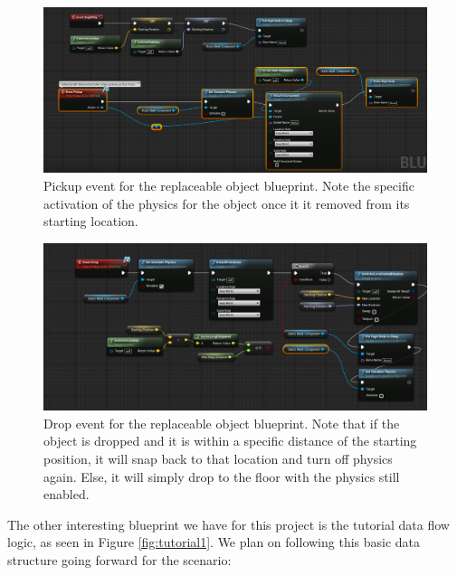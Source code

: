 \documentclass[onecolumn, draftclsnofoot,10pt, compsoc]{IEEEtran}
\begin{document}
\begin{figure}[ht!]
    \centering
    \includegraphics[scale=0.4]{pickup_bp1.png}
    \caption{Pickup event for the replaceable object blueprint. Note the specific activation of the physics for the object once it it removed from its starting location.}
    \label{fig:pickup1}
\end{figure}

\begin{figure}[ht!]
    \centering
    \includegraphics[scale=0.4]{pickup_bp2.png}
    \caption{Drop event for the replaceable object blueprint. Note that if the object is dropped and it is within a specific distance of the starting position, it will snap back to that location and turn off physics again. Else, it will simply drop to the floor with the physics still enabled.}
    \label{fig:pickup2}
\end{figure}

\newpage

The other interesting blueprint we have for this project is the tutorial data flow logic, as seen in Figure \ref{fig:tutorial1}. We plan on following this basic data structure going forward for the scenario:
\end{document}
